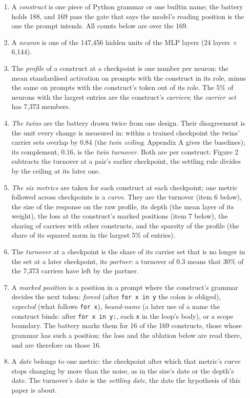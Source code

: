 \documentclass{article}
\begin{document}
\begin{enumerate}[topsep=2pt,itemsep=1pt,parsep=0pt,partopsep=0pt,leftmargin=*]
\item A \emph{construct} is one piece of Python grammar or one builtin name; the battery holds 188, and 169 pass the gate that says the model's reading position is the one the prompt intends. All counts below are over the 169.
\item A \emph{neuron} is one of the 147,456 hidden units of the MLP layers (24 layers $\times$ 6,144).
\item The \emph{profile} of a construct at a checkpoint is one number per neuron: the mean standardised activation on prompts with the construct in its role, minus the same on prompts with the construct's token out of its role. The 5\% of neurons with the largest entries are the construct's \emph{carriers}; the \emph{carrier set} has 7,373 members.
\item \emph{The twins} are the battery drawn twice from one design. Their disagreement is the unit every change is measured in: within a trained checkpoint the twins' carrier sets overlap by 0.84 (the \emph{twin ceiling}; Appendix A gives the baselines); its complement, 0.16, is the \emph{twin turnover}. Both are per construct: Figure 2 subtracts the turnover at a pair's earlier checkpoint, the settling rule divides by the ceiling at its later one.
\item \emph{The six metrics} are taken for each construct at each checkpoint; one metric followed across checkpoints is a \emph{curve}. They are the turnover (item 6 below), the size of the response on the raw profile, its depth (the mean layer of its weight), the loss at the construct's marked positions (item 7 below), the sharing of carriers with other constructs, and the sparsity of the profile (the share of its squared norm in the largest 5\% of entries).
\item The \emph{turnover} at a checkpoint is the share of its carrier set that is no longer in the set at a later checkpoint, its \emph{partner}: a turnover of 0.3 means that 30\% of the 7,373 carriers have left by the partner.
\item A \emph{marked position} is a position in a prompt where the construct's grammar decides the next token: \emph{forced} (after \texttt{for x in y} the colon is obliged), \emph{expected} (what follows \texttt{for x}), \emph{bound-name} (a later use of a name the construct binds: after \texttt{for x in y:}, each \texttt{x} in the loop's body), or a scope boundary. The battery marks them for 16 of the 169 constructs, those whose grammar has such a position; the loss and the ablation below are read there, and are therefore on those 16.
\item A \emph{date} belongs to one metric: the checkpoint after which that metric's curve stops changing by more than the noise, as in the size's date or the depth's date. The turnover's date is the \emph{settling date}, the date the hypothesis of this paper is about.
\end{enumerate}
\end{document}
